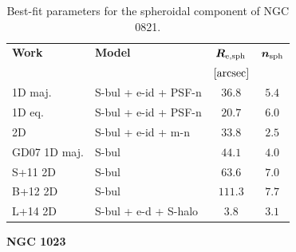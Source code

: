 \documentclass[preprint2]{emulateapj}
\begin{document}
  \begin{table}[h]
  \small
  \caption{Best-fit parameters for the spheroidal component of NGC 0821.}
  \begin{center}
  \begin{tabular}{llcc}
  \hline
  {\bf Work} & {\bf Model}   & $\bm R_{\rm e,sph}$    & $\bm n_{\rm sph}$ \\
    &  &  $[\rm arcsec]$ & \\
  \hline
  1D maj. & S-bul + e-id + PSF-n & $36.8$  &  $5.4$ \\
  1D eq.  & S-bul + e-id + PSF-n & $20.7$  &  $6.0$ \\
  2D      & S-bul + e-id + m-n   & $33.8$  &  $2.5$ \\
  \hline
  GD07 1D maj.    & S-bul 		 & $44.1$   &  $4.0$ \\           
  S+11 2D    & S-bul 		 & $63.6$   &  $7.0$ \\           
  B+12 2D    & S-bul 		 & $111.3$  &  $7.7$ \\           
  L+14 2D    & S-bul + e-d + S-halo & $3.8$    &  $3.1$ \\
  \hline
  \end{tabular}
  \end{center}
  \label{tab:n0821}
  \end{table}



  \clearpage\newpage\noindent
  {\bf NGC 1023 \\}
  
\end{document}
